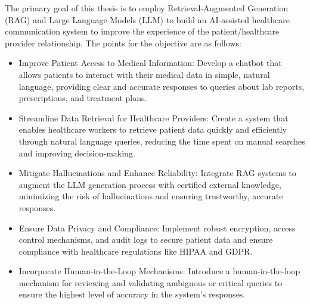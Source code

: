 The primary goal of this thesis is to employ Retrieval-Augmented Generation (RAG) and Large Language Models (LLM) to build an AI-assisted healthcare communication system to improve the experience of the patient/healthcare provider relationship. The points for the objective are as follows:

\begin{itemize}
    \item Improve Patient Access to Medical Information: Develop a chatbot that allows patients to interact with their medical data in simple, natural language, providing clear and accurate responses to queries about lab reports, prescriptions, and treatment plans.
    \item Streamline Data Retrieval for Healthcare Providers: Create a system that enables healthcare workers to retrieve patient data quickly and efficiently through natural language queries, reducing the time spent on manual searches and improving decision-making.
    \item Mitigate Hallucinations and Enhance Reliability: Integrate RAG systems to augment the LLM generation process with certified external knowledge, minimizing the risk of hallucinations and ensuring trustworthy, accurate responses.
    \item Ensure Data Privacy and Compliance: Implement robust encryption, access control mechanisms, and audit logs to secure patient data and ensure compliance with healthcare regulations like HIPAA\cite{hipaa} and GDPR\@.
    \item Incorporate Human-in-the-Loop Mechanisms: Introduce a human-in-the-loop mechanism for reviewing and validating ambiguous or critical queries to ensure the highest level of accuracy in the system's responses.
\end{itemize}